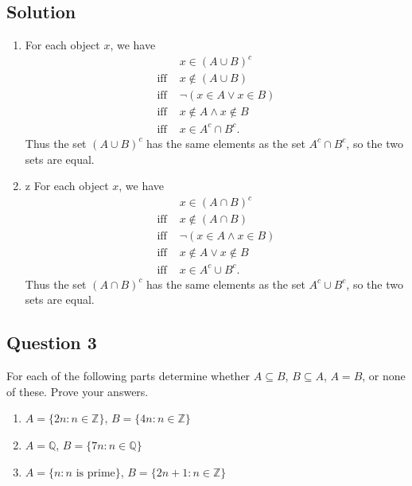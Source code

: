 \documentclass{article}
\begin{document}
\subsection*{Solution}
    \begin{enumerate}
        \item 
        For each object $x$, we have
        \begin{align*}
            & x \in (A \cup B)^{c} \\
            \text{iff } & x \notin (A \cup B) \tag{\footnotesize definition of complement}\\
            \text{iff } & \neg (x \in A \lor x \in B) \tag{\footnotesize definition of union and ``does not belong" symbol} \\
            \text{iff } & x \notin A \land x \notin B \tag{\footnotesize De Morgan's laws for logical equivalences} \\
            \text{iff } & x \in A^{c} \cap B^{c}. \tag{\footnotesize definition of complement and intersection}
        \end{align*}
        Thus the set $(A \cup B)^{c}$ has the same elements as the set $A^{c} \cap B^{c}$, so the two sets are equal.
        \item z
        For each object $x$, we have
        \begin{align*}
            & x \in (A \cap B)^{c} \\
            \text{iff } & x \notin (A \cap B) \tag{\footnotesize definition of complement} \\
            \text{iff } & \neg (x \in A \land x \in B) \tag{\footnotesize definition of intersection and ``does not belong" symbol} \\
            \text{iff } & x \notin A \lor x \notin B\tag{\footnotesize De Morgan's laws for logical equivalences} \\
            \text{iff } & x \in A^{c} \cup B^{c}. \tag{\footnotesize definition of complement and union}
        \end{align*}
        Thus the set $(A \cap B)^{c}$ has the same elements as the set $A^{c} \cup B^{c}$, so the two sets are equal.
    \end{enumerate}

\subsection*{Question 3}
    For each of the following parts determine whether $A \subseteq B$, $B \subseteq A$, $A = B$, or none of these. Prove your answers.
    \begin{enumerate}
        \item $A = \{2n : n \in \mathbb{Z}\}$, $B = \{4n : n \in \mathbb{Z}\}$
        \item $A = \mathbb{Q}$, $B = \{7n : n \in \mathbb{Q}\}$
        \item $A = \{n : n \text{ is prime}\}$, $B = \{2n + 1 : n \in \mathbb{Z}\}$
    \end{enumerate}
\end{document}
